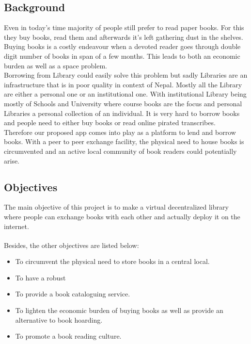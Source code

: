 \documentclass[12pt]{article}
\begin{document}
\subsection{Background}
Even in today’s time majority of people still prefer to read paper books. For this they buy books, read them and afterwards it’s left gathering dust in the shelves. Buying books is a costly endeavour when a devoted reader goes through double digit number of books in span of a few months. This leads to both an economic burden as well as a space problem.
\\
Borrowing from Library could easily solve this problem but sadly Libraries are an infrastructure that is in poor quality in context of Nepal. Mostly all the Library are either a personal one or an institutional one. With institutional Library being mostly of Schools and University where course books are the focus and personal Libraries a personal collection of an individual. It is very hard to borrow books and people need to either buy books or read online pirated transcribes.
\\
Therefore our proposed app comes into play as a platform to lend and borrow books. With a peer to peer exchange facility, the physical need to house books is circumvented and an active local community of book readers could potentially arise.

\vspace*{5mm}
\subsection{Objectives}
The main objective of this project is to make a virtual decentralized library where people can exchange books with each other and actually deploy it on the internet.
\\\\
Besides, the other objectives are listed below:
\begin{itemize}
    \item To circumvent the physical need to store books in a central local.
    \item To have a robust 
    \item To provide a book cataloguing service.
    \item To lighten the economic burden of buying books as well as provide an alternative to book hoarding.
    \item To promote a book reading culture.
\end{itemize}

\vspace*{5mm}
\end{document}
